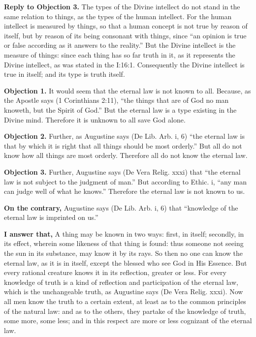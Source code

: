 \textbf{Reply to Objection 3.} The types of the Divine intellect do not stand in the same relation to things, as the types of the human intellect. For the human intellect is measured by things, so that a human concept is not true by reason of itself, but by reason of its being consonant with things, since ``an opinion is true or false according as it answers to the reality.'' But the Divine intellect is the measure of things: since each thing has so far truth in it, as it represents the Divine intellect, as was stated in the I:16:1. Consequently the Divine intellect is true in itself; and its type is truth itself.


\textbf{Objection 1.} It would seem that the eternal law is not known to all. Because, as the Apostle says (1 Corinthians 2:11), ``the things that are of God no man knoweth, but the Spirit of God.'' But the eternal law is a type existing in the Divine mind. Therefore it is unknown to all save God alone.

\textbf{Objection 2.} Further, as Augustine says (De Lib. Arb. i, 6) ``the eternal law is that by which it is right that all things should be most orderly.'' But all do not know how all things are most orderly. Therefore all do not know the eternal law.

\textbf{Objection 3.} Further, Augustine says (De Vera Relig. xxxi) that ``the eternal law is not subject to the judgment of man.'' But according to Ethic. i, ``any man can judge well of what he knows.'' Therefore the eternal law is not known to us.

\textbf{On the contrary,} Augustine says (De Lib. Arb. i, 6) that ``knowledge of the eternal law is imprinted on us.''

\textbf{I answer that,} A thing may be known in two ways: first, in itself; secondly, in its effect, wherein some likeness of that thing is found: thus someone not seeing the sun in its substance, may know it by its rays. So then no one can know the eternal law, as it is in itself, except the blessed who see God in His Essence. But every rational creature knows it in its reflection, greater or less. For every knowledge of truth is a kind of reflection and participation of the eternal law, which is the unchangeable truth, as Augustine says (De Vera Relig. xxxi). Now all men know the truth to a certain extent, at least as to the common principles of the natural law: and as to the others, they partake of the knowledge of truth, some more, some less; and in this respect are more or less cognizant of the eternal law.

